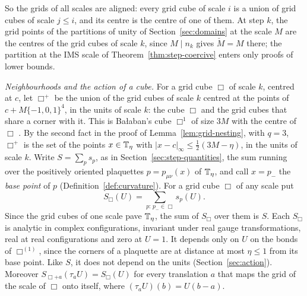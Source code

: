 So the grids of all scales are aligned: every grid cube of scale $i$ is a union of grid cubes of scale $j\le i$, and its centre is the centre of one of them. At step $k$, the grid points of the partitions of unity of Section~\ref{sec:domains} at the scale $M$ are the centres of the grid cubes of scale $k$, since $M\mid n_k$ gives $\check M=M$ there; the partition at the IMS scale of Theorem~\ref{thm:step-coercive} enters only proofs of lower bounds.

\emph{Neighbourhoods and the action of a cube.} For a grid cube $\Box$ of scale $k$, centred at $c$, let $\Box^+$ be the union of the grid cubes of scale $k$ centred at the points of $c+M\{-1,0,1\}^4$, in the units of scale $k$: the cube $\Box$ and the grid cubes that share a corner with it. This is Ba\l aban's cube $\Box^1$ of size $3M$ with the centre of $\Box$ \cite[p.~257]{BalYM4I}. By the second fact in the proof of Lemma~\ref{lem:grid-nesting}, with $q=3$, $\Box^+$ is the set of the points $x\in\mathbb T_\eta$ with $|x-c|_\infty\le\frac12(3M-\eta)$, in the units of scale $k$. Write $S=\sum_ps_p$, as in Section~\ref{sec:step-quantities}, the sum running over the positively oriented plaquettes $p=p_{\mu\nu}(x)$ of $\mathbb T_\eta$, and call $x=p_-$ the \emph{base point} of $p$ (Definition~\ref{def:curvature}). For a grid cube $\Box$ of any scale put
\[
S_\Box(U)=\sum_{p:\,p_-\in\Box}s_p(U).
\]
Since the grid cubes of one scale pave $\mathbb T_\eta$, the sum of $S_\Box$ over them is $S$. Each $S_\Box$ is analytic in complex configurations, invariant under real gauge transformations, real at real configurations and zero at $U=1$. It depends only on $U$ on the bonds of $\Box^{(1)}$, since the corners of a plaquette are at distance at most $\eta\le1$ from its base point. Like $S$, it does not depend on the units (Section~\ref{sec:action}). Moreover $S_{\Box+a}(\tau_aU)=S_\Box(U)$ for every translation $a$ that maps the grid of the scale of $\Box$ onto itself, where $(\tau_aU)(b)=U(b-a)$.

